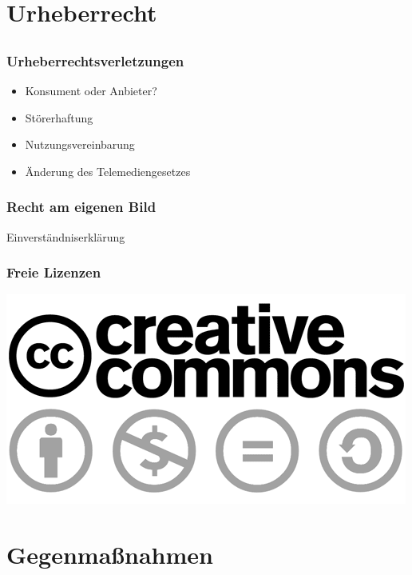\documentclass[12pt]{beamer}
\begin{document}
\section{Urheberrecht}
\subsection{}

\begin{frame}
  \frametitle{Urheberrechtsverletzungen}
  \begin{itemize}
    \item<2-> Konsument oder Anbieter?
    \item<3-> Störerhaftung
    \item<4-> Nutzungsvereinbarung
    \item<5-> Änderung des Telemediengesetzes
  \end{itemize}
\end{frame}

\begin{frame}
  \frametitle{Recht am eigenen Bild}
  \pause
  \begin{center}
    \large{Einverständniserklärung}
  \end{center}
\end{frame}

\begin{frame}
  \frametitle{Freie Lizenzen}
  \pause
  \begin{center}
    \includegraphics[height=0.4\textheight]{img/creative_commons.png}
  \end{center}
\end{frame}

\section{Gegenmaßnahmen}
\subsection{}
\end{document}
